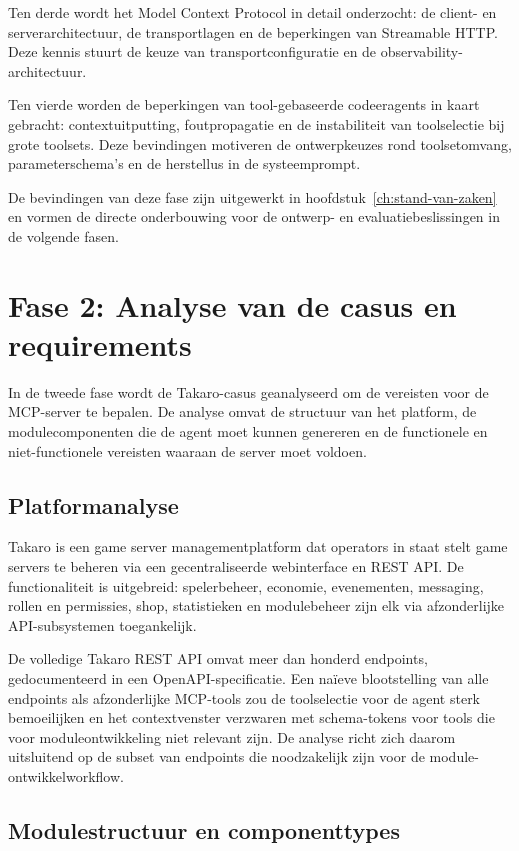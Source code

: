 Ten derde wordt het Model Context Protocol in detail onderzocht: de client- en serverarchitectuur, de transportlagen en de beperkingen van Streamable HTTP. Deze kennis stuurt de keuze van transportconfiguratie en de observability-architectuur.

Ten vierde worden de beperkingen van tool-gebaseerde codeeragents in kaart gebracht: contextuitputting, foutpropagatie en de instabiliteit van toolselectie bij grote toolsets. Deze bevindingen motiveren de ontwerpkeuzes rond toolsetomvang, parameterschema’s en de herstellus in de systeemprompt.

De bevindingen van deze fase zijn uitgewerkt in hoofdstuk~\ref{ch:stand-van-zaken} en vormen de directe onderbouwing voor de ontwerp- en evaluatiebeslissingen in de volgende fasen.

\section{Fase 2: Analyse van de casus en requirements}\label{sec:fase2}

In de tweede fase wordt de Takaro-casus geanalyseerd om de vereisten voor de MCP-server te bepalen. De analyse omvat de structuur van het platform, de modulecomponenten die de agent moet kunnen genereren en de functionele en niet-functionele vereisten waaraan de server moet voldoen.

\subsection{Platformanalyse}\label{subsec:platformanalyse}

Takaro is een game server managementplatform dat operators in staat stelt game servers te beheren via een gecentraliseerde webinterface en REST API. De functionaliteit is uitgebreid: spelerbeheer, economie, evenementen, messaging, rollen en permissies, shop, statistieken en modulebeheer zijn elk via afzonderlijke API-subsystemen toegankelijk.

De volledige Takaro REST API omvat meer dan honderd endpoints, gedocumenteerd in een OpenAPI-specificatie. Een naïeve blootstelling van alle endpoints als afzonderlijke MCP-tools zou de toolselectie voor de agent sterk bemoeilijken en het contextvenster verzwaren met schema-tokens voor tools die voor moduleontwikkeling niet relevant zijn. De analyse richt zich daarom uitsluitend op de subset van endpoints die noodzakelijk zijn voor de module-ontwikkelworkflow.

\subsection{Modulestructuur en componenttypes}\label{subsec:modulestructuur}

